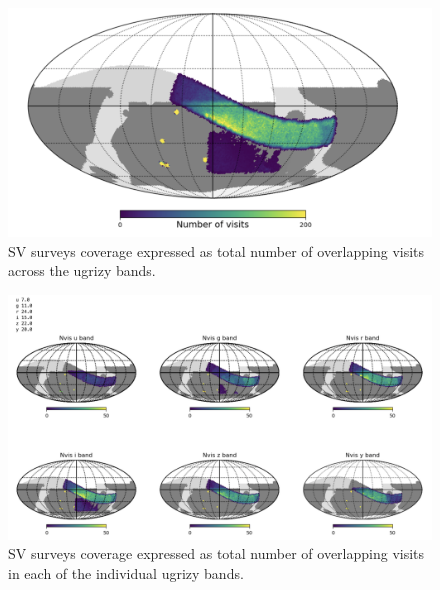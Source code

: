 \begin{figure}[htbp]
    \begin{center}
    \includegraphics[width=1\textwidth]{./sv_surveys_coverage.png}
    \caption{SV surveys coverage expressed as total number of overlapping visits across the ugrizy bands.}
    \label{sv_surveys_coverage}
    \end{center}
\end{figure}

\begin{figure}[htbp]
    \begin{center}
    \includegraphics[width=1\textwidth]{./sv_surveys_coverage_band.png}
    \caption{SV surveys coverage expressed as total number of overlapping visits in each of the individual ugrizy bands.}
    \label{sv_surveys_coverage_band}
    \end{center}
\end{figure}

